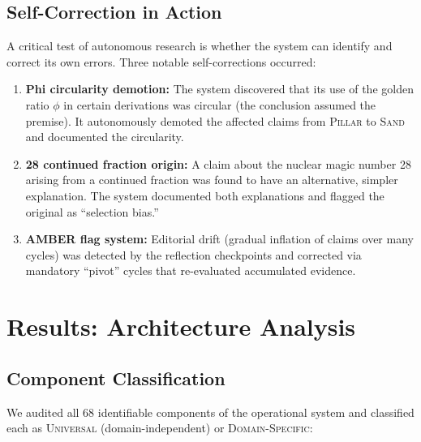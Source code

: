 \documentclass[11pt,a4paper]{article}
\newcommand{\pillar}{\textsc{Pillar}}
\newcommand{\sand}{\textsc{Sand}}
\begin{document}

\subsection{Self-Correction in Action}

A critical test of autonomous research is whether the system can identify and correct
its own errors. Three notable self-corrections occurred:

\begin{enumerate}[nosep]
    \item \textbf{Phi circularity demotion:} The system discovered that its use of
          the golden ratio $\phi$ in certain derivations was circular (the conclusion
          assumed the premise). It autonomously demoted the affected claims from
          \pillar{} to \sand{} and documented the circularity.
    \item \textbf{28 continued fraction origin:} A claim about the nuclear magic
          number 28 arising from a continued fraction was found to have an
          alternative, simpler explanation. The system documented both explanations
          and flagged the original as ``selection bias.''
    \item \textbf{AMBER flag system:} Editorial drift (gradual inflation of claims
          over many cycles) was detected by the reflection checkpoints and corrected
          via mandatory ``pivot'' cycles that re-evaluated accumulated evidence.
\end{enumerate}

\section{Results: Architecture Analysis}
\label{sec:results}

\subsection{Component Classification}

We audited all 68 identifiable components of the operational system and classified
each as \textsc{Universal} (domain-independent) or \textsc{Domain-Specific}:
\end{document}
